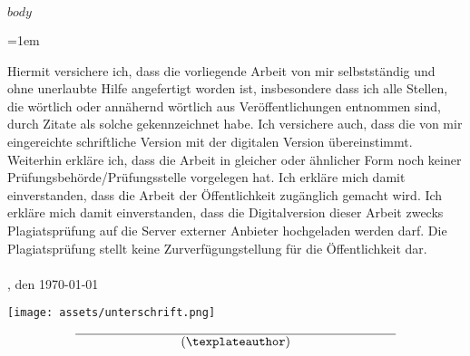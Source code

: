     $body$

    \clearpage

\begin{singlespace}

    \emergencystretch=1em
    \printbibliography[heading=bibintoc]
    \newpage
\end{singlespace}

\newpage
\pagestyle{empty}
Hiermit versichere ich, dass die vorliegende Arbeit von mir selbstständig und ohne unerlaubte Hilfe angefertigt worden ist, insbesondere dass ich alle Stellen, die wörtlich oder annähernd wörtlich aus Veröffentlichungen entnommen sind, durch Zitate als solche gekennzeichnet habe. Ich versichere auch, dass die von mir eingereichte schriftliche Version mit der digitalen Version übereinstimmt. Weiterhin erkläre ich, dass die Arbeit in gleicher oder ähnlicher Form noch keiner Prüfungsbehörde/Prüfungsstelle vorgelegen hat. Ich erkläre mich damit einverstanden, dass die Arbeit der Öffentlichkeit zugänglich gemacht wird. Ich erkläre mich damit einverstanden, dass die Digitalversion dieser Arbeit zwecks Plagiatsprüfung auf die Server externer Anbieter hochgeladen werden darf. Die Plagiatsprüfung stellt keine Zurverfügungstellung für die Öffentlichkeit dar.
\\
\\
\noindent \texplatelocation, den \today
\begin{flushright}
\texttt{[image: assets/unterschrift.png]}\hspace*{+21mm}

\vspace{-2mm}
$$\overline{~~~~~~~~~~~~~~~~~~~~~~~~~\mbox{(\texplateauthor)}~~~~~~~~~~~~~~~~~~~~~~~~~}$$
\end{flushright}


